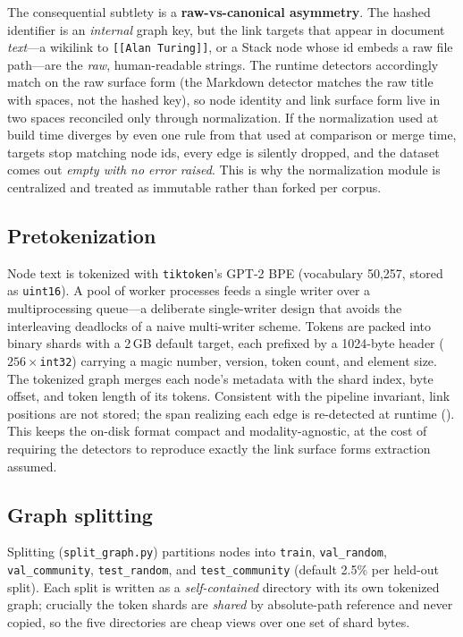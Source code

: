 The consequential subtlety is a \textbf{raw-vs-canonical asymmetry}. The hashed
identifier is an \emph{internal} graph key, but the link targets that appear in
document \emph{text}---a wikilink to \texttt{[[Alan Turing]]}, or a Stack node
whose id embeds a raw file path---are the \emph{raw}, human-readable strings.
The runtime detectors accordingly match on the raw surface form (the Markdown
detector matches the raw title with spaces, not the hashed key), so node identity
and link surface form live in two spaces reconciled only through normalization.
If the normalization used at build time diverges by even one rule from that used
at comparison or merge time, targets stop matching node ids, every edge is
silently dropped, and the dataset comes out \emph{empty with no error raised}.
This is why the normalization module is centralized and treated as immutable
rather than forked per corpus.

\subsection{Pretokenization}
\label{app:datasets:pretok}

Node text is tokenized with \texttt{tiktoken}'s GPT-2 BPE (vocabulary 50{,}257,
stored as \texttt{uint16}). A pool of worker processes feeds a single writer over
a multiprocessing queue---a deliberate single-writer design that avoids the
interleaving deadlocks of a naive multi-writer scheme. Tokens are packed into
binary shards with a 2\,GB default target, each prefixed by a 1024-byte header
($256{\times}$\texttt{int32}) carrying a magic number, version, token count, and
element size. The tokenized graph merges each node's metadata with the shard
index, byte offset, and token length of its tokens. Consistent with the pipeline
invariant, link positions are not stored; the span realizing each edge is
re-detected at runtime (). This keeps the on-disk format
compact and modality-agnostic, at the cost of requiring the detectors to
reproduce exactly the link surface forms extraction assumed.

\subsection{Graph splitting}
\label{app:datasets:split}

Splitting (\texttt{split\_graph.py}) partitions nodes into \texttt{train},
\texttt{val\_random}, \texttt{val\_community}, \texttt{test\_random}, and
\texttt{test\_community} (default 2.5\% per held-out split). Each split is written
as a \emph{self-contained} directory with its own tokenized graph; crucially the
token shards are \emph{shared} by absolute-path reference and never copied, so the
five directories are cheap views over one set of shard bytes.

